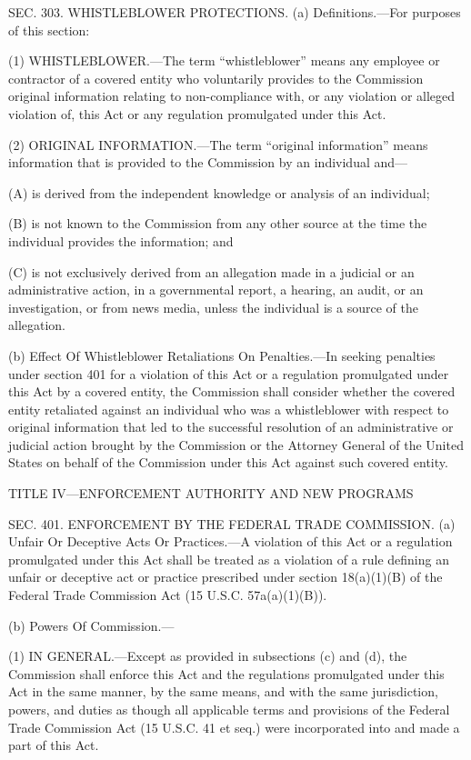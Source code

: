 SEC. 303. WHISTLEBLOWER PROTECTIONS.
(a) Definitions.—For purposes of this section:

(1) WHISTLEBLOWER.—The term “whistleblower” means any employee or contractor of a covered entity who voluntarily provides to the Commission original information relating to non-compliance with, or any violation or alleged violation of, this Act or any regulation promulgated under this Act.

(2) ORIGINAL INFORMATION.—The term “original information” means information that is provided to the Commission by an individual and—

(A) is derived from the independent knowledge or analysis of an individual;

(B) is not known to the Commission from any other source at the time the individual provides the information; and

(C) is not exclusively derived from an allegation made in a judicial or an administrative action, in a governmental report, a hearing, an audit, or an investigation, or from news media, unless the individual is a source of the allegation.

(b) Effect Of Whistleblower Retaliations On Penalties.—In seeking penalties under section 401 for a violation of this Act or a regulation promulgated under this Act by a covered entity, the Commission shall consider whether the covered entity retaliated against an individual who was a whistleblower with respect to original information that led to the successful resolution of an administrative or judicial action brought by the Commission or the Attorney General of the United States on behalf of the Commission under this Act against such covered entity.

TITLE IV—ENFORCEMENT AUTHORITY AND NEW PROGRAMS

SEC. 401. ENFORCEMENT BY THE FEDERAL TRADE COMMISSION.
(a) Unfair Or Deceptive Acts Or Practices.—A violation of this Act or a regulation promulgated under this Act shall be treated as a violation of a rule defining an unfair or deceptive act or practice prescribed under section 18(a)(1)(B) of the Federal Trade Commission Act (15 U.S.C. 57a(a)(1)(B)).

(b) Powers Of Commission.—

(1) IN GENERAL.—Except as provided in subsections (c) and (d), the Commission shall enforce this Act and the regulations promulgated under this Act in the same manner, by the same means, and with the same jurisdiction, powers, and duties as though all applicable terms and provisions of the Federal Trade Commission Act (15 U.S.C. 41 et seq.) were incorporated into and made a part of this Act.

